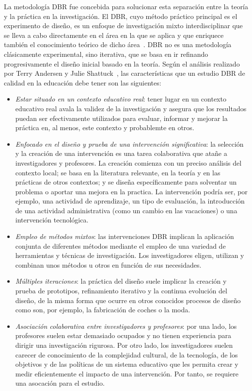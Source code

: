 La metodología DBR fue concebida para solucionar esta separación entre la teoría y la práctica en la investigación. El DBR, cuyo método práctico principal es el experimento de diseño, es un enfoque de investigación mixto interdisciplinar que se lleva a cabo directamente en el área en la que se aplica y que enriquece también el conocimiento teórico de dicho área~\cite{reimann2011design}. DBR no es una metodología clásicamente experimental, sino iterativa, que se basa en ir refinando progresivamente el diseño inicial basado en la teoría. Según el análisis realizado por Terry Andersen y Julie Shattuck~\cite{anderson2012design}, las características que un estudio DBR de calidad en la educación debe tener son las siguientes:

\begin{itemize}
\item \emph{Estar situado en un contexto educativo real}: tener lugar en un contexto educativo real avala la validez de la investigación y asegura que los resultados puedan ser efectivamente utilizados para evaluar, informar y mejorar la práctica en, al menos, este contexto y probablemte en otros.
\item \emph{Enfocado en el diseño y prueba de una intervención significativa}: la selección y la creación de una intervención es una tarea colaborativa que atañe a investigadores y profesores. La creación comienza con un preciso análisis del contexto local; se basa en la literatura relevante, en la teoría y en las prácticas de otros contextos; y se diseña específicamente para solventar un problema o aportar una mejora en la practica. La intervención podría ser, por ejemplo, una actividad de aprendizaje, un tipo de evaluación, la introducción de una actividad administrativa (como un cambio en las vacaciones) o una intervención tecnológica. %
\item \emph{Empleo de métodos mixtos}: las intervenciones DBR implican la aplicación conjunta de diferentes métodos mediante el empleo de una variedad de herramientas y técnicas de investigación. Los investigadores eligen, utilizan y combinan unos métodos u otros en función de sus necesidades.
\item \emph{Múltiples iteraciones}: la práctica del diseño suele implicar la creación y prueba de prototipos, refinamiento iterativo y la continua evolución del diseño, de la misma forma que ocurre en otros conocidos procesos de diseño como son, por ejemplo, la fabricación de coches o la moda.
\item \emph{Asociación colaborativa entre investigadores y profesores}: por una lado, los profesores suelen estar demasiado ocupados y no tienen experiencia para dirigir una investigación rigurosa. Por otro lado, los investigadores suelen carecer de conocimiento de la complejidad cultural, de la tecnología, de los objetivos y de las políticas de un sistema educativo que les permita crear y medir eficientemente el impacto de una intervención. Por tanto, se requiere una asocación para el estudio.

\end{itemize}
